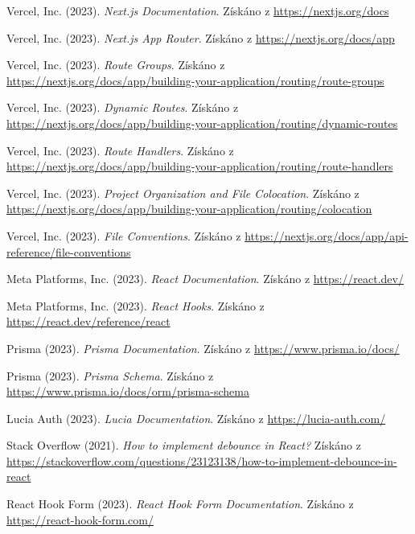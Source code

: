 \documentclass[12pt]{article}
\begin{document}
\newpage
\renewcommand\refname{Seznam použitých zdrojů}
\begin{thebibliography}{99}

 Vercel, Inc. (2023). \textit{Next.js Documentation}. Získáno z \url{https://nextjs.org/docs}

 Vercel, Inc. (2023). \textit{Next.js App Router}. Získáno z \url{https://nextjs.org/docs/app}

 Vercel, Inc. (2023). \textit{Route Groups}. Získáno z \url{https://nextjs.org/docs/app/building-your-application/routing/route-groups}

 Vercel, Inc. (2023). \textit{Dynamic Routes}. Získáno z \url{https://nextjs.org/docs/app/building-your-application/routing/dynamic-routes}

 Vercel, Inc. (2023). \textit{Route Handlers}. Získáno z \url{https://nextjs.org/docs/app/building-your-application/routing/route-handlers}

 Vercel, Inc. (2023). \textit{Project Organization and File Colocation}. Získáno z \url{https://nextjs.org/docs/app/building-your-application/routing/colocation}

 Vercel, Inc. (2023). \textit{File Conventions}. Získáno z \url{https://nextjs.org/docs/app/api-reference/file-conventions}

 Meta Platforms, Inc. (2023). \textit{React Documentation}. Získáno z \url{https://react.dev/}

 Meta Platforms, Inc. (2023). \textit{React Hooks}. Získáno z \url{https://react.dev/reference/react}

 Prisma (2023). \textit{Prisma Documentation}. Získáno z \url{https://www.prisma.io/docs/}

 Prisma (2023). \textit{Prisma Schema}. Získáno z \url{https://www.prisma.io/docs/orm/prisma-schema}

 Lucia Auth (2023). \textit{Lucia Documentation}. Získáno z \url{https://lucia-auth.com/}

 Stack Overflow (2021). \textit{How to implement debounce in React?} Získáno z \url{https://stackoverflow.com/questions/23123138/how-to-implement-debounce-in-react}

 React Hook Form (2023). \textit{React Hook Form Documentation}. Získáno z \url{https://react-hook-form.com/}


\end{thebibliography}
\end{document}
